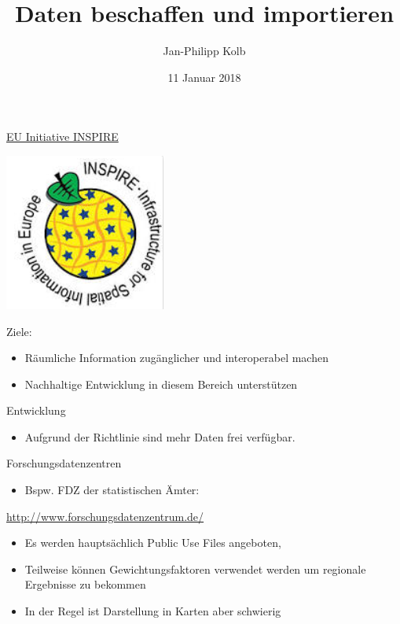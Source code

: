 \documentclass[ignorenonframetext,]{beamer}
\title{Daten beschaffen und importieren}
\author{Jan-Philipp Kolb}
\date{11 Januar 2018}
\providecommand{\tightlist}{%
  \setlength{\itemsep}{0pt}\setlength{\parskip}{0pt}}
\begin{document}
\frame{\titlepage}

\begin{frame}{\href{http://inspire.ec.europa.eu/reports/Registration_form.pdf}{EU
Initiative INSPIRE}}
\protect\hypertarget{eu-initiative-inspire}{}

\includegraphics{figure/inspire.PNG}

\begin{block}{Ziele:}

\begin{itemize}
\tightlist
\item
  Räumliche Information zugänglicher und interoperabel machen
\item
  Nachhaltige Entwicklung in diesem Bereich unterstützen
\end{itemize}

\end{block}

\begin{block}{Entwicklung}

\begin{itemize}
\tightlist
\item
  Aufgrund der Richtlinie sind mehr Daten frei verfügbar.
\end{itemize}

\end{block}

\end{frame}

\begin{frame}{Forschungsdatenzentren}
\protect\hypertarget{forschungsdatenzentren}{}

\begin{itemize}
\tightlist
\item
  Bspw. FDZ der statistischen Ämter:
\end{itemize}

\url{http://www.forschungsdatenzentrum.de/}

\begin{itemize}
\item
  Es werden hauptsächlich Public Use Files angeboten,
\item
  Teilweise können Gewichtungsfaktoren verwendet werden um regionale
  Ergebnisse zu bekommen
\item
  In der Regel ist Darstellung in Karten aber schwierig
\end{itemize}

\end{frame}
\end{document}
